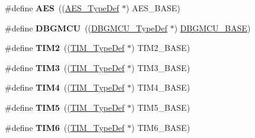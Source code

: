 \begin{DoxyCompactItemize}
\item 
\hypertarget{group___peripheral__declaration_ga5412ac9ff64f4ab68c289a0da739eaef}{\#define {\bfseries A\-E\-S}~((\hyperlink{struct_a_e_s___type_def}{A\-E\-S\-\_\-\-Type\-Def} $\ast$) A\-E\-S\-\_\-\-B\-A\-S\-E)}\label{group___peripheral__declaration_ga5412ac9ff64f4ab68c289a0da739eaef}

\item 
\hypertarget{group___peripheral__declaration_ga92ec6d9ec2251fda7d4ce09748cd74b4}{\#define {\bfseries D\-B\-G\-M\-C\-U}~((\hyperlink{struct_d_b_g_m_c_u___type_def}{D\-B\-G\-M\-C\-U\-\_\-\-Type\-Def} $\ast$) \hyperlink{group___peripheral__memory__map_ga4adaf4fd82ccc3a538f1f27a70cdbbef}{D\-B\-G\-M\-C\-U\-\_\-\-B\-A\-S\-E})}\label{group___peripheral__declaration_ga92ec6d9ec2251fda7d4ce09748cd74b4}

\item 
\hypertarget{group___peripheral__declaration_ga3cfac9f2e43673f790f8668d48b4b92b}{\#define {\bfseries T\-I\-M2}~((\hyperlink{struct_t_i_m___type_def}{T\-I\-M\-\_\-\-Type\-Def} $\ast$) T\-I\-M2\-\_\-\-B\-A\-S\-E)}\label{group___peripheral__declaration_ga3cfac9f2e43673f790f8668d48b4b92b}

\item 
\hypertarget{group___peripheral__declaration_ga61ee4c391385607d7af432b63905fcc9}{\#define {\bfseries T\-I\-M3}~((\hyperlink{struct_t_i_m___type_def}{T\-I\-M\-\_\-\-Type\-Def} $\ast$) T\-I\-M3\-\_\-\-B\-A\-S\-E)}\label{group___peripheral__declaration_ga61ee4c391385607d7af432b63905fcc9}

\item 
\hypertarget{group___peripheral__declaration_ga91a09bad8bdc7a1cb3d85cf49c94c8ec}{\#define {\bfseries T\-I\-M4}~((\hyperlink{struct_t_i_m___type_def}{T\-I\-M\-\_\-\-Type\-Def} $\ast$) T\-I\-M4\-\_\-\-B\-A\-S\-E)}\label{group___peripheral__declaration_ga91a09bad8bdc7a1cb3d85cf49c94c8ec}

\item 
\hypertarget{group___peripheral__declaration_ga5125ff6a23a2ed66e2e19bd196128c14}{\#define {\bfseries T\-I\-M5}~((\hyperlink{struct_t_i_m___type_def}{T\-I\-M\-\_\-\-Type\-Def} $\ast$) T\-I\-M5\-\_\-\-B\-A\-S\-E)}\label{group___peripheral__declaration_ga5125ff6a23a2ed66e2e19bd196128c14}

\item 
\hypertarget{group___peripheral__declaration_gac7b4ed55f9201b498b38c962cca97314}{\#define {\bfseries T\-I\-M6}~((\hyperlink{struct_t_i_m___type_def}{T\-I\-M\-\_\-\-Type\-Def} $\ast$) T\-I\-M6\-\_\-\-B\-A\-S\-E)}\label{group___peripheral__declaration_gac7b4ed55f9201b498b38c962cca97314}


\end{DoxyCompactItemize}
